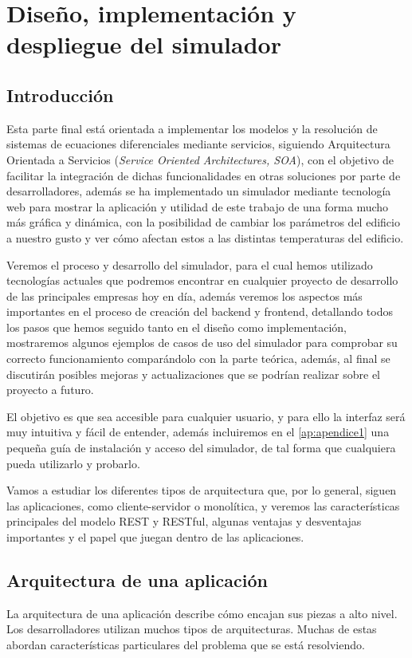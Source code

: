 \chapter{Diseño, implementación y despliegue del simulador}
\section{Introducción}
Esta parte final está orientada a implementar los modelos y la resolución de sistemas de ecuaciones diferenciales mediante servicios, siguiendo Arquitectura Orientada a Servicios (\textit{Service Oriented Architectures, SOA}), con el objetivo de facilitar la integración de dichas funcionalidades en otras soluciones por parte de desarrolladores, además se ha implementado un simulador mediante tecnología web para mostrar la aplicación y utilidad de este trabajo de una forma mucho más gráfica y dinámica, con la posibilidad de cambiar los parámetros del edificio a nuestro gusto y ver cómo afectan estos a las distintas temperaturas del edificio.

Veremos el proceso y desarrollo del simulador, para el cual hemos utilizado tecnologías actuales que podremos encontrar en cualquier proyecto de desarrollo de las principales empresas hoy en día, además veremos los aspectos más importantes en el proceso de creación del backend y frontend, detallando todos los pasos que hemos seguido tanto en el diseño como implementación, mostraremos algunos ejemplos de casos de uso del simulador para comprobar su correcto funcionamiento comparándolo con la parte teórica, además, al final se discutirán posibles mejoras y actualizaciones que se podrían realizar sobre el proyecto a futuro.

El objetivo es que sea accesible para cualquier usuario, y para ello la interfaz será muy intuitiva y fácil de entender, además incluiremos en el \autoref{ap:apendice1} una pequeña guía de instalación y acceso del simulador, de tal forma que cualquiera pueda utilizarlo y probarlo.

Vamos a estudiar los diferentes tipos de arquitectura que, por lo general, siguen las aplicaciones, como cliente-servidor o monolítica, y veremos las características principales del modelo REST y RESTful, algunas ventajas y desventajas importantes y el papel que juegan dentro de las aplicaciones.
\section{Arquitectura de una aplicación}
La arquitectura de una aplicación describe cómo encajan sus piezas a alto nivel. Los desarrolladores utilizan muchos tipos de arquitecturas. Muchas de estas abordan características particulares del problema que se está resolviendo.

